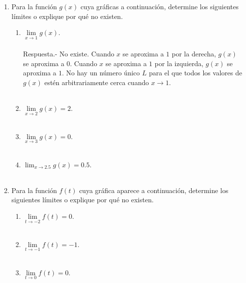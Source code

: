 \begin{enumerate}

\item Para la función $g(x)$ cuya gráficas a continuación, determine los siguientes límites o explique por qué no existen.
\begin{enumerate}[\bfseries a)]

    \item $\lim\limits_{x\to 1} g(x)$.\\\\
    Respuesta.-\; No existe. Cuando $x$ se aproxima a $1$ por la derecha, $g(x)$ se aproxima a $0$. Cuando $x$ se aproxima a $1$ por la izquierda, $g(x)$ se aproxima a $1$. No hay un número único $L$ para el que todos los valores de $g(x)$ estén arbitrariamente cerca cuando ${x \to 1}$.\\\\

    \item $\lim\limits_{x\to 2} g(x) = 2$.\\\\

    \item $\lim\limits_{x\to 3} g(x) = 0$.\\\\

    \item $\lim_{x\to 2.5} g(x) = 0.5$.\\\\

\end{enumerate}

\item Para la función $f(t)$ cuya gráfica aparece a continuación, determine los siguientes límites o explique por qué no existen.
\begin{enumerate}[\bfseries a)]
    
    \item $\lim\limits_{t\to -2} f(t) = 0$.\\\\

    \item $\lim\limits_{t\to -1} f(t) = -1$.\\\\

    \item $\lim\limits_{t\to 0} f(t) = 0$.\\\\


\end{enumerate}
\end{enumerate}
